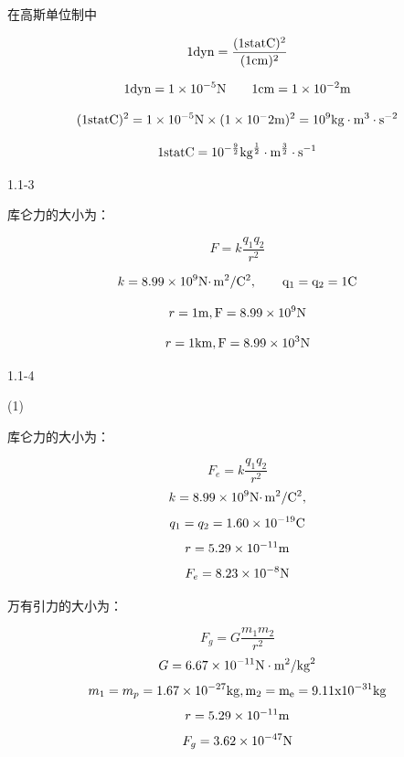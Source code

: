 \documentclass{article}
\begin{document}

在高斯单位制中

$$1\rm{dyn}=\frac{(1\rm{statC})^2}{(1\rm{cm})^2}$$

$$1\rm{dyn}=1\times10^{-5}\rm{N}\qquad1\rm{cm}=1\times10^{-2}\rm{m}$$

$$(1\rm{statC})^2=1\times10^{-5}\rm{N}\times(1\times10^-2\rm{m})^2=10^9\rm{kg}\cdot \rm{m}^3\cdot\rm{s}^{-2}$$

$$1\rm{statC}=10^{-\frac{9}{2}}\rm{kg}^{\frac{1}{2}}\cdot \rm{m}^{\frac{3}{2}}\cdot\rm{s}^{-1}$$




1.1-3

库仑力的大小为：

$$F=k\frac{q_1q_2}{r^2}$$

$$k=8.99\times10^9\rm{N}\cdotp \rm{m}^2/ \rm{C}^2,\qquad q_1=q_2=1\rm{C}$$

$$r=1\rm{m},F=8.99\times10^9\rm{N}$$

$$r=1\rm{km},F=8.99\times10^3\rm{N}$$

\newpage




1.1-4

(1)

库仑力的大小为：

$$F_e=k\frac{q_1q_2}{r^2}$$
$$k=8.99\times10^9\rm{N}\cdotp \rm{m}^2/ \rm{C}^2,$$
$$ q_1=q_2=1.60\times10^{-19}\rm{C} $$
$$  r=5.29\times10^{-11}\rm{m}$$
$$F_e=8.23\times 10^{-8}\rm{N}$$

万有引力的大小为：

$$F_g = G \frac{m_1 m_2}{r^2}$$
$$G=6.67\times10^{-11} \rm{N}\cdot \rm{m}^2/\mathrm{kg}^2$$
$$m_1=m_p=1.67\times10^{-27}\rm{kg},m_2=m_e=9.11x10^{-31}\rm{kg}$$
$$  r=5.29\times10^{-11}\rm{m}$$
$$F_g=3.62\times10^{-47}\rm{N}$$
\end{document}
